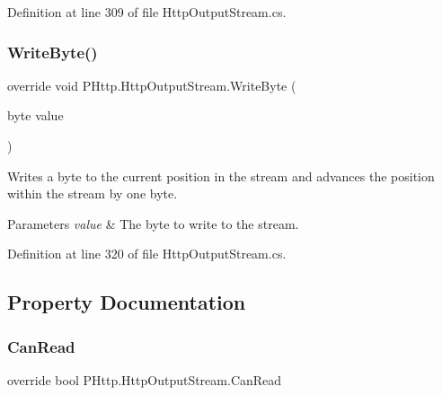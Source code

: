 Definition at line 309 of file Http\+Output\+Stream.\+cs.

\mbox{\label{class_p_http_1_1_http_output_stream_abc3e17eed0f5721726d260a0417c6f42}} 
\subsubsection{\texorpdfstring{Write\+Byte()}{WriteByte()}}
{\footnotesize\ttfamily override void P\+Http.\+Http\+Output\+Stream.\+Write\+Byte (\begin{DoxyParamCaption}\item[{byte}]{value }\end{DoxyParamCaption})}



Writes a byte to the current position in the stream and advances the position within the stream by one byte. 


\begin{DoxyParams}{Parameters}
{\em value} & The byte to write to the stream. \\
\hline
\end{DoxyParams}


Definition at line 320 of file Http\+Output\+Stream.\+cs.



\subsection{Property Documentation}
\mbox{\label{class_p_http_1_1_http_output_stream_a4aa9c138e2d4228f179b5e615016b90e}} 
\subsubsection{\texorpdfstring{Can\+Read}{CanRead}}
{\footnotesize\ttfamily override bool P\+Http.\+Http\+Output\+Stream.\+Can\+Read\hspace{0.3cm}{\ttfamily [get]}}



